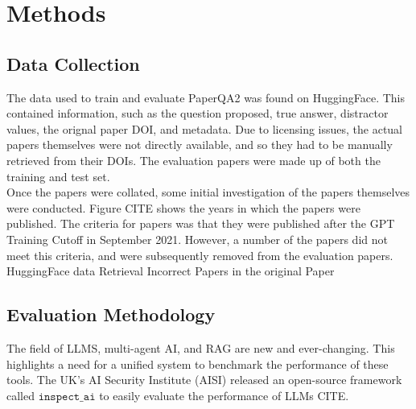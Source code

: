 \section{Methods}
\label{sec:methods}

\subsection{Data Collection}
The data used to train and evaluate PaperQA2 was found on HuggingFace. 
This contained information, such as the question proposed, true answer, distractor values, the orignal paper DOI, and metadata.
Due to licensing issues, the actual papers themselves were not directly available, and so they had to be manually retrieved from their DOIs. 
The evaluation papers were made up of both the training and test set.\\

Once the papers were collated, some initial investigation of the papers themselves were conducted. 
Figure CITE shows the years in which the papers were published. 
The criteria for papers was that they were published after the GPT Training Cutoff in September 2021. 
However, a number of the papers did not meet this criteria, and were subsequently removed from the evaluation papers. \\

HuggingFace data Retrieval
Incorrect Papers in the original Paper

\subsection{Evaluation Methodology}
The field of LLMS, multi-agent AI, and RAG are new and ever-changing.
This highlights a need for a unified system to benchmark the performance of these tools.
The UK's AI Security Institute (AISI) released an open-source framework called $\texttt{inspect_ai}$ to easily evaluate the performance of LLMs CITE. 